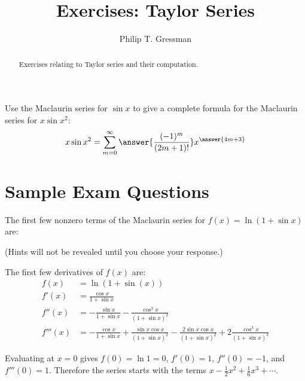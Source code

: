 \documentclass{ximera}
\title{Exercises: Taylor Series}
\author{Philip T. Gressman}
\begin{document}
\begin{abstract}
Exercises relating to Taylor series and their computation.
\end{abstract}
\maketitle


\begin{exercise}
Use the Maclaurin series for $\sin x$ to give a complete formula for the Maclaurin series for $x \sin x^2$:
\[ x \sin x^2 = \sum_{m=0}^\infty  \answer{\frac{(-1)^m}{(2m+1)!}} x^{\answer{4m+3}} \]
\end{exercise}


\section*{Sample Exam Questions}

\begin{question}%

The first few nonzero terms of the Maclaurin series for \(f(x) = \ln ( 1 + \sin x)\) are:
\begin{multiplechoice}
\end{multiplechoice}
(Hints will not be revealed until you choose your response.)
\begin{feedback}
The first few derivatives of \(f(x)\) are:
\[\begin{aligned}
f(x) & = \ln (1 + \sin(x)) \\
f'(x) & = \frac{ \cos x}{1 + \sin x} \\
f''(x) & = - \frac{\sin x}{1 + \sin x} - \frac{\cos^2 x}{(1 + \sin x)^2} \\
f'''(x) & = - \frac{\cos x}{1 + \sin x} + \frac{\sin x \cos x}{(1 + \sin x)^2} - \frac{2 \sin x \cos x}{(1 + \sin x)^2} + 2 \frac{\cos^3 x}{(1 + \sin x)^3}
\end{aligned}\]
\begin{hint}
Evaluating at \(x = 0\) gives \(f(0) = \ln 1 = 0\), \(f'(0) = 1\), \(f''(0) = -1\), and \(f'''(0) = 1\). Therefore the series starts with the terms \(x - \frac{1}{2} x^2 + \frac{1}{6} x^3 + \cdots\).
\end{hint}
\end{feedback}

\end{question}
\end{document}
